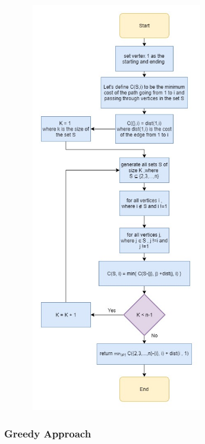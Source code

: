 \documentclass[12pt]{article}
\newcounter{subsubsubsection}[subsubsection]
\begin{document}
\begin{center}
	\includegraphics[width=10cm,height=18cm]{./assets/flowchart/held-karp.png}\\
\end{center}

\subsubsection{ Greedy Approach }
\end{document}
